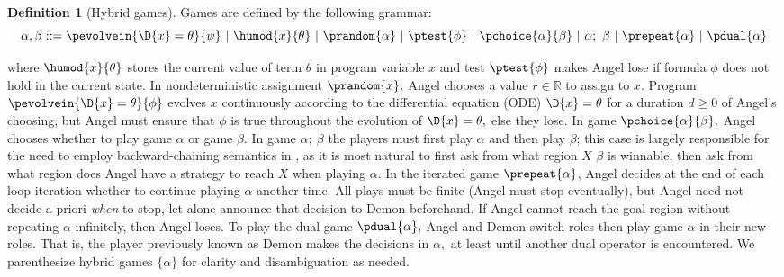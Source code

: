 \documentclass[12pt]{cmuthesis}
\theoremstyle{definition}
\newtheorem{definition}{Definition}
\theoremstyle{remark}
\newcommand{\bebecomes}{\mathrel{::=}}
\newcommand{\alternative}{~|~}
\newcommand{\ivr}{\psi}
\begin{document}
\begin{definition}[Hybrid games]
Games are defined by the following grammar:  
\[\alpha,\beta \bebecomes \pevolvein{\D{x}=\theta}{\ivr} \alternative \humod{x}{\theta} \alternative \prandom{\alpha} \alternative \ptest{\phi} \alternative \pchoice{\alpha}{\beta} \alternative \alpha;~\beta \alternative \prepeat{\alpha} \alternative \pdual{\alpha}\]
\end{definition} 
where $\humod{x}{\theta}$ stores the current value of term $\theta$ in program variable $x$  and test $\ptest{\phi}$ makes Angel lose if formula $\phi$ does not hold in the current state.
In nondeterministic assignment $\prandom{x},$ Angel chooses a value $r \in \mathbb{R}$ to assign to $x$.
Program $\pevolvein{\D{x}=\theta}{\phi}$ evolves $x$ continuously according to the differential equation (ODE) $\D{x}=\theta$ for a duration $d \geq 0$ of Angel's choosing, but Angel must ensure that $\phi$ is true throughout the evolution of $\D{x}=\theta,$ else they lose.
In game $\pchoice{\alpha}{\beta},$ Angel chooses whether to play game $\alpha$ or game $\beta$.
In game $\alpha;~\beta$ the players must first play $\alpha$ and then play $\beta$; this case is largely responsible for the need to employ backward-chaining semantics in \dGL, as it is most natural to first ask from what region $X$ $\beta$ is winnable, then ask from what region does Angel have a strategy to reach $X$ when playing $\alpha$.
In the iterated game $\prepeat{\alpha}$, Angel decides at the end of each loop iteration whether to continue playing $\alpha$ another time.
All plays must be finite (Angel must stop eventually), but Angel need not decide a-priori \emph{when} to stop, let alone announce that decision to Demon beforehand.
If Angel cannot reach the goal region without repeating $\alpha$ infinitely, then Angel loses.
To play the dual game $\pdual{\alpha},$ Angel and Demon switch roles then play game $\alpha$ in their new roles.
That is, the player previously known as Demon makes the decisions in $\alpha,$ at least until another dual operator is encountered.
We parenthesize hybrid games $\{ \alpha \}$ for clarity and disambiguation as needed.
\end{document}
